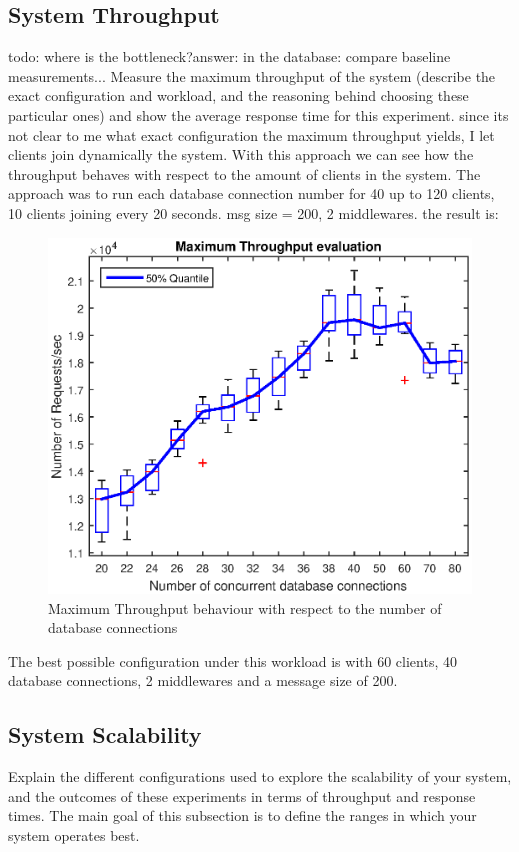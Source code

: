 \documentclass[11pt]{article}
\begin{document}
\subsection{System Throughput}\label{sec:system-throughput}
todo: where is the bottleneck?answer: in the database: compare baseline measurements...\newline
Measure the maximum throughput of the system (describe the exact
configuration and workload, and the reasoning behind choosing these
particular ones) and show the average response time for this experiment.
\newline
since its not clear to me what exact configuration the maximum throughput yields, I let clients join dynamically the system. With this approach we can see how the throughput behaves with respect to the amount of clients in the system. The approach was to run each database connection number for 40 up to 120 clients, 10 clients joining every 20 seconds. msg size = 200, 2 middlewares.
the result is:
\begin{figure}[!htb]
\centering
\includegraphics[width=0.7\linewidth]{figures/max_tp}
\caption{Maximum Throughput behaviour with respect to the number of database connections}
\label{fig:max_tp}
\end{figure}
The best possible configuration under this workload is with 60 clients, 40 database connections, 2 middlewares and a message size of 200.

\subsection{System Scalability}\label{sec:system-scalability}

Explain the different configurations used to explore the scalability of
your system, and the outcomes of these experiments in terms of
throughput and response times. The main goal of this subsection is to
define the ranges in which your system operates best.
\end{document}
